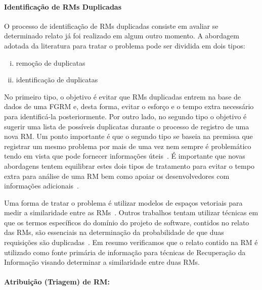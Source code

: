 \paragraph{Identificação de RMs Duplicadas} O processo de identificação de RMs
duplicadas consiste em avaliar se determinado relato já foi realizado em algum
outro momento. A abordagem adotada da literatura para tratar o problema pode ser
dividida em dois tipos\cite{kaushik2012comparative, tian2012improved}:

\begin{enumerate}[(i)]
	\item remoção de duplicatas
	\item identificação de duplicatas
\end{enumerate}

No primeiro tipo, o objetivo é evitar que RMs duplicadas entrem na base de dados
de uma FGRM e, desta forma, evitar o esforço e o tempo extra necessário para
identificá-la posteriormente. Por outro lado, no segundo tipo o objetivo é
sugerir uma lista de possíveis duplicatas durante o processo de registro de uma
nova RM\@. Um ponto importante é que o segundo tipo se baseia na premissa que
registrar um mesmo problema por mais de uma vez nem sempre é problemático tendo
em vista que pode fornecer informações úteis~\cite{bettenburg2008duplicate}. É
importante que novas abordagens tentem equilibrar estes dois tipos de tratamento
para evitar o tempo extra para análise de uma RM bem como apoiar os
desenvolvedores com informações
adicionais~\cite{Lerch:2013:FDY:2495256.2495763,Thung2014}.

Uma forma de tratar o problema é utilizar modelos de espaços vetoriais para
medir a similaridade entre as RMs~\cite{liu2014faceted, sun2010discriminative,
	Thung2014,tomavsev2013exploiting}. Outros trabalhos tentam utilizar técnicas
em que os termos específicos do domínio do projeto de software, contidos no
relato das RMs, são essenciais na determinação da probabilidade de que duas
requisições são duplicadas~\cite{hindle2016contextual, alipour2013contextual}.
Em resumo verificamos que o relato contido na RM é utilizado como fonte primária
de informação para técnicas de Re\-cu\-pe\-ra\-ção da Informação visando
determinar a similaridade entre duas RMs.

\paragraph{Atribuição (Triagem) de RM:}

